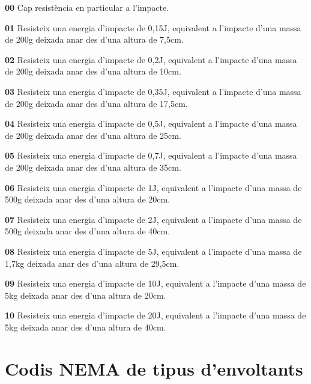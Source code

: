 \begin{list}{}
   {\setlength{\labelwidth}{10mm} \setlength{\leftmargin}{10mm} \setlength{\labelsep}{2mm}}
   \item[\textbf{00}] Cap resist\`{e}ncia en particular a l'impacte.
   \item[\textbf{01}] Resisteix una energia d'impacte de 0{,}15\unit{J}, equivalent a l'impacte d'una massa de 200\unit{g} deixada anar des d'una altura de 7{,}5\unit{cm}.
   \item[\textbf{02}] Resisteix una energia d'impacte de 0{,}2\unit{J}, equivalent a l'impacte d'una massa de 200\unit{g} deixada anar des d'una altura de 10\unit{cm}.
   \item[\textbf{03}] Resisteix una energia d'impacte de 0{,}35\unit{J}, equivalent a l'impacte d'una massa de 200\unit{g} deixada anar des d'una altura de 17{,}5\unit{cm}.
   \item[\textbf{04}] Resisteix una energia d'impacte de 0{,}5\unit{J}, equivalent a l'impacte d'una massa de 200\unit{g} deixada anar des d'una altura de 25\unit{cm}.
   \item[\textbf{05}] Resisteix una energia d'impacte de 0{,}7\unit{J}, equivalent a l'impacte d'una massa de 200\unit{g} deixada anar des d'una altura de 35\unit{cm}.
   \item[\textbf{06}]Resisteix una energia d'impacte de 1\unit{J}, equivalent a l'impacte d'una massa de 500\unit{g} deixada anar des d'una altura de 20\unit{cm}.
   \item[\textbf{07}]Resisteix una energia d'impacte de 2\unit{J}, equivalent a l'impacte d'una massa de 500\unit{g} deixada anar des d'una altura de 40\unit{cm}.
   \item[\textbf{08}]Resisteix una energia d'impacte de 5\unit{J}, equivalent a l'impacte d'una massa de 1{,}7\unit{kg} deixada anar des d'una altura de 29{,}5\unit{cm}.
   \item[\textbf{09}]Resisteix una energia d'impacte de 10\unit{J}, equivalent a l'impacte d'una massa de 5\unit{kg} deixada anar des d'una altura de 20\unit{cm}.
   \item[\textbf{10}]Resisteix una energia d'impacte de 20\unit{J}, equivalent a l'impacte d'una massa de 5\unit{kg} deixada anar des d'una altura de 40\unit{cm}.
\end{list}



\section{Codis NEMA de tipus d'envoltants}
 

